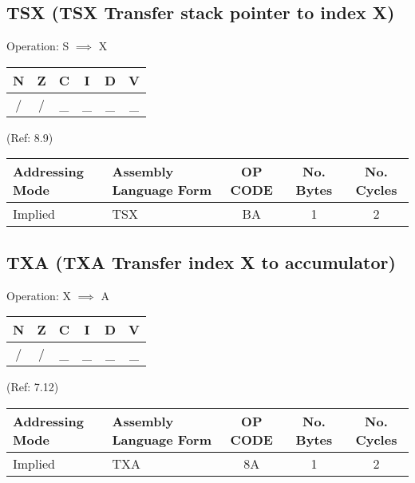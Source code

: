 \documentclass{article}
\begin{document}
  \subsection{TSX (TSX Transfer stack pointer to index X)}
  Operation:  S $\implies$ X
  \begin{table}[H]
  \centering
  \begin{tabular}{|c c c c c c|}
  \hline
  N&Z&C&I&D&V\\
  \hline
  / & / & \_ & \_ & \_ & \_\\
  \hline
  \end{tabular}
  \end{table}
                                 (Ref: 8.9)
  \begin{table}[H]
  \centering
  \begin{tabular}{|l|l|c|c|c|}
  \hline
    Addressing Mode& Assembly Language Form& OP CODE &No. Bytes&No. Cycles\\
  \hline
     Implied       &   TSX                 &    BA   &    1    &    2     \\
  \hline
  \end{tabular}
  \end{table}

  \subsection{TXA (TXA Transfer index X to accumulator)}
  Operation:  X $\implies$ A
  \begin{table}[H]
  \centering
  \begin{tabular}{|c c c c c c|}
  \hline
  N&Z&C&I&D&V\\
  \hline
  / & / & \_ & \_ & \_ & \_\\
  \hline
  \end{tabular}
  \end{table}
                                 (Ref: 7.12)
  \begin{table}[H]
  \centering
  \begin{tabular}{|l|l|c|c|c|}
  \hline
    Addressing Mode& Assembly Language Form& OP CODE &No. Bytes&No. Cycles\\
  \hline
     Implied       &   TXA                 &    8A   &    1    &    2     \\
  \hline
  \end{tabular}
  \end{table}
\end{document}
